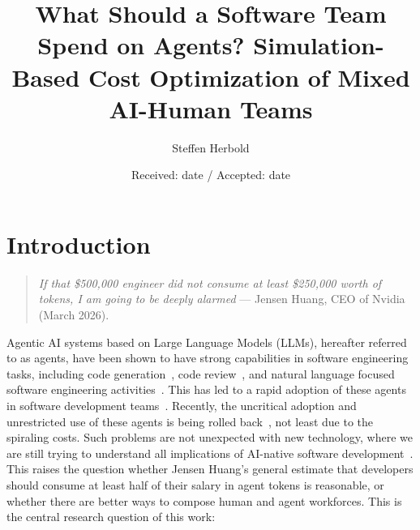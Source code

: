 \documentclass[smallextended]{svjour3}       %
\begin{document}
\title{What Should a Software Team Spend on Agents? Simulation-Based Cost Optimization of Mixed AI-Human Teams}

\author{Steffen Herbold}



\date{Received: date / Accepted: date}


\maketitle




\section{Introduction}
\label{sec:introduction}

\begin{quote}
  \textit{If that \$500{,}000 engineer did not consume at least \$250{,}000 worth of tokens, I am going to be deeply alarmed} --- Jensen Huang, CEO of Nvidia (March 2026).
\end{quote}

Agentic AI systems based on Large Language Models (LLMs), hereafter referred to as agents, have been shown to have strong capabilities in software engineering tasks, including code generation~\citep{aleithan2024swebenchplus,merrill2026terminal}, code review~\citep{Hu2026}, and natural language focused software engineering activities~\citep{pena2026selusoftwareengineeringlanguage}. This has led to a rapid adoption of these agents in software development teams~\citep{bogdanov2026agentadoption}. Recently, the uncritical adoption and unrestricted use of these agents is being rolled back~\citep{juricic2026metaclaude}, not least due to the spiraling costs. Such problems are not unexpected with new technology, where we are still trying to understand all implications of AI-native software development~\citep{hassan2026ainative}. This raises the question whether Jensen Huang's general estimate that developers should consume at least half of their salary in agent tokens is reasonable, or whether there are better ways to compose human and agent workforces. This is the central research question of this work:
\end{document}
